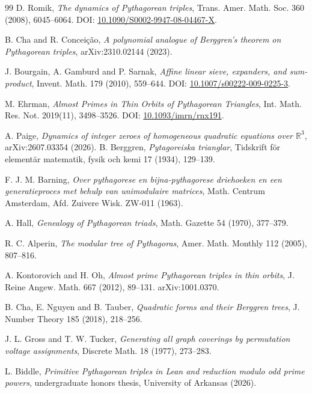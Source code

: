 \documentclass[11pt]{article}
\begin{document}
\begin{thebibliography}{99}
D. Romik,
\emph{The dynamics of Pythagorean triples},
Trans. Amer. Math. Soc. 360 (2008), 6045--6064.
DOI: \href{https://doi.org/10.1090/S0002-9947-08-04467-X}{10.1090/S0002-9947-08-04467-X}.

B. Cha and R. Concei\c{c}\~ao,
\emph{A polynomial analogue of Berggren's theorem on Pythagorean triples},
arXiv:2310.02144 (2023).

J. Bourgain, A. Gamburd and P. Sarnak,
\emph{Affine linear sieve, expanders, and sum-product},
Invent. Math. 179 (2010), 559--644.
DOI: \href{https://doi.org/10.1007/s00222-009-0225-3}{10.1007/s00222-009-0225-3}.

M. Ehrman,
\emph{Almost Primes in Thin Orbits of Pythagorean Triangles},
Int. Math. Res. Not. 2019(11), 3498--3526.
DOI: \href{https://doi.org/10.1093/imrn/rnx191}{10.1093/imrn/rnx191}.

A. Paige,
\emph{Dynamics of integer zeroes of homogeneous quadratic equations over $\mathbb R^3$},
arXiv:2607.03354 (2026).
B. Berggren,
\emph{Pytagoreiska trianglar},
Tidskrift f\"or element\"ar matematik, fysik och kemi 17 (1934), 129--139.

F. J. M. Barning,
\emph{Over pythagorese en bijna-pythagorese driehoeken en een generatieproces met behulp van unimodulaire matrices},
Math. Centrum Amsterdam, Afd. Zuivere Wisk. ZW-011 (1963).

A. Hall,
\emph{Genealogy of Pythagorean triads},
Math. Gazette 54 (1970), 377--379.

R. C. Alperin,
\emph{The modular tree of Pythagoras},
Amer. Math. Monthly 112 (2005), 807--816.

A. Kontorovich and H. Oh,
\emph{Almost prime Pythagorean triples in thin orbits},
J. Reine Angew. Math. 667 (2012), 89--131.
arXiv:1001.0370.

B. Cha, E. Nguyen and B. Tauber,
\emph{Quadratic forms and their Berggren trees},
J. Number Theory 185 (2018), 218--256.

J. L. Gross and T. W. Tucker,
\emph{Generating all graph coverings by permutation voltage assignments},
Discrete Math. 18 (1977), 273--283.

L. Biddle,
\emph{Primitive Pythagorean triples in Lean and reduction modulo odd prime powers},
undergraduate honors thesis, University of Arkansas (2026).

\end{thebibliography}
\end{document}

